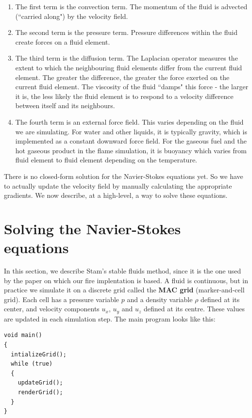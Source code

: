 \documentclass[12pt]{report}
\begin{document}
\begin{enumerate}
  \item The first term is the convection term. The momentum of the fluid is advected (``carried along") by the velocity field.
  \item The second term is the pressure term. Pressure differences within the fluid create forces on a fluid element.
  \item The third term is the diffusion term. The Laplacian operator measures the extent to which the neighbouring fluid elements differ from the current fluid element. The greater the difference, the greater the force exerted on the current fluid element. The viscosity of the fluid ``damps" this force - the larger it is, the less likely the fluid element is to respond to a velocity difference between itself and its neighbours.
  \item The fourth term is an external force field. This varies depending on the fluid we are simulating. For water and other liquids, it is typically gravity, which is implemented as a constant downward force field. For the gaseous fuel and the hot gaseous product in the flame simulation, it is buoyancy which varies from fluid element to fluid element depending on the temperature.
\end{enumerate}

There is no closed-form solution for the Navier-Stokes equations yet. So we have to actually update the velocity field by manually calculating the appropriate gradients. We now describe, at a high-level, a way to solve these equations.

\section{Solving the Navier-Stokes equations}

In this section, we describe Stam's stable fluids method, since it is the one used by the paper on which our fire implentation is based. A fluid is continuous, but in practice we simulate it on a discrete grid called the \textbf{MAC grid} (marker-and-cell grid). Each cell has a pressure variable $p$ and a density variable $\rho$ defined at its center, and velocity components $u_x$, $u_y$ and $u_z$ defined at its centre. These values are updated in each simulation step. The main program looks like this:

\lstset{language=C++}
\begin{lstlisting}
void main()
{
  intializeGrid();
  while (true)
  {
    updateGrid();
    renderGrid();
  }
}
\end{lstlisting}
\end{document}
